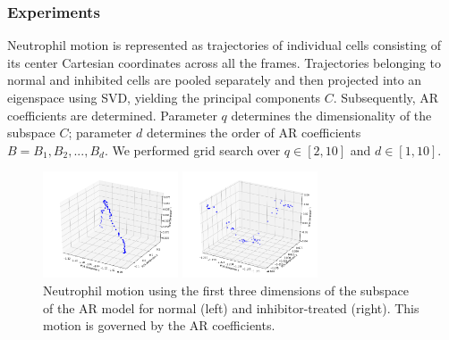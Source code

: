 \documentclass{article}
\newcommand{\squeezeup}{\vspace{-2.5mm}}
\begin{document}
\subsubsection{Experiments}
\label{sec:arsubsubhead1}
\squeezeup
Neutrophil motion is represented as trajectories of individual cells consisting of its center Cartesian coordinates across all the frames. Trajectories belonging to normal and inhibited cells are pooled separately and then projected into an eigenspace using SVD, yielding the principal components $C$. Subsequently, AR coefficients are determined. Parameter $q$ determines the dimensionality of the subspace $C$; parameter $d$ determines the order of AR coefficients \(B = {B_{1} ,B_{2} ,...,B_{d}}\). We performed grid search over \(q \in [2,10]\) and \(d \in [1,10]\).
\squeezeup
\begin{figure} [htb]
\begin{minipage}[b]{.48\linewidth}
  \centering
  \centerline{\includegraphics[width=4.0cm]{normalpca3d}}
  \vspace{-0.3cm}
\end{minipage}
\hfill
\begin{minipage}[b]{0.48\linewidth}
  \centering
  \centerline{\includegraphics[width=4.0cm]{mrspca3d}}
  \vspace{-0.3cm}
\end{minipage}
%
\caption{Neutrophil motion using the first three dimensions of the subspace of the AR model for normal (left) and inhibitor-treated (right). This motion is governed by the AR coefficients.}
\vspace{-0.5cm}
\label{fig:res1}
%
\end{figure}
\squeezeup
\vspace{-0.20cm}
\end{document}
